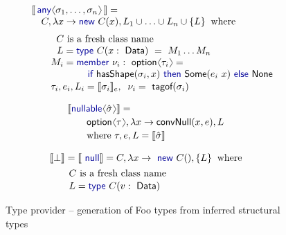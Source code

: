 \documentclass[10pt,preprint,clearpagebib]{sigplanconf}
\newcommand{\langl}{\begin{picture}(4.5,7)
\put(1.1,2.5){\rotatebox{60}{\line(1,0){5.5}}}
\put(1.1,2.5){\rotatebox{300}{\line(1,0){5.5}}}
\end{picture}}
\newcommand{\rangl}{\begin{picture}(4.5,7)
\put(.9,2.5){\rotatebox{120}{\line(1,0){5.5}}}
\put(.9,2.5){\rotatebox{240}{\line(1,0){5.5}}}
\end{picture}}
\newcommand{\kvd}[1]{\textnormal{\textcolor{kvdclr}{\sffamily #1}}}
\newcommand{\ident}[1]{\textnormal{\sffamily #1}}
\newcommand{\tytagof}{\ident{tagof}}
\newcommand{\sem}[1]{\llbracket #1 \rrbracket}
\begin{document}
\begin{figure}
\begin{multicols}{2}
\noindent
\begin{equation*}
\begin{array}{l}
 \sem{\,\kvd{any}\langl\sigma_1, \ldots, \sigma_n\rangl\,} = \\
 \quad C, \lambda x\rightarrow\kvd{new}~C(x), L_1\cup\ldots\cup L_n\cup\{ L \}\;\;\textnormal{where}\\[0.6em]
 \qquad \;\;C~\textnormal{is a fresh class name} \\
 \qquad \;\,\,L = \kvd{type}~C(x:\ident{Data})~=~M_1\ldots M_n \\
 \qquad M_i = \kvd{member}~\nu_i:\ident{option}\langl\tau_i\rangl=\\
 \hspace{5.8em}  \kvd{if}~\ident{hasShape}(\sigma_i, x)~\kvd{then}~ \ident{Some}(e_i~x)~\kvd{else}~\ident{None} \\[0.1em]
 \qquad \tau_i, e_i, L_i = \sem{\sigma_i}_e,\;\; \nu_i=\tytagof{(\sigma_i)}
\end{array}
\end{equation*}
\vspace{-2em}

\begin{equation*}
\hspace{-1.3em}
\begin{array}{l}
 \sem{\kvd{nullable}\langl\hat{\sigma}\rangl} = \\[0.2em]
 \qquad \ident{option}\langl\tau\rangl, \lambda x \rightarrow \ident{convNull}(x,e), L\\[0.2em] 
 \qquad \textnormal{where}~\tau, e, L = \sem{\hat{\sigma}}
\end{array}
\end{equation*}
\vspace{-2em}

\begin{equation*}
\hspace{-1.3em}
\begin{array}{l}
 \sem{\bot} = \sem{\kvd{null}} = C, \lambda x\rightarrow \kvd{new}~C(), \{ L \} \;\;\textnormal{where}\\[0.4em]
 \qquad C~\textnormal{is a fresh class name} \\[0.1em]
 \qquad L = \kvd{type}~C(v:\ident{Data})
\end{array}
\end{equation*}
\end{multicols}

\caption{Type provider -- generation of Foo types from inferred structural types}
\label{fig:tp-generation}
\vspace{-0.5em}
\end{figure}
\end{document}

